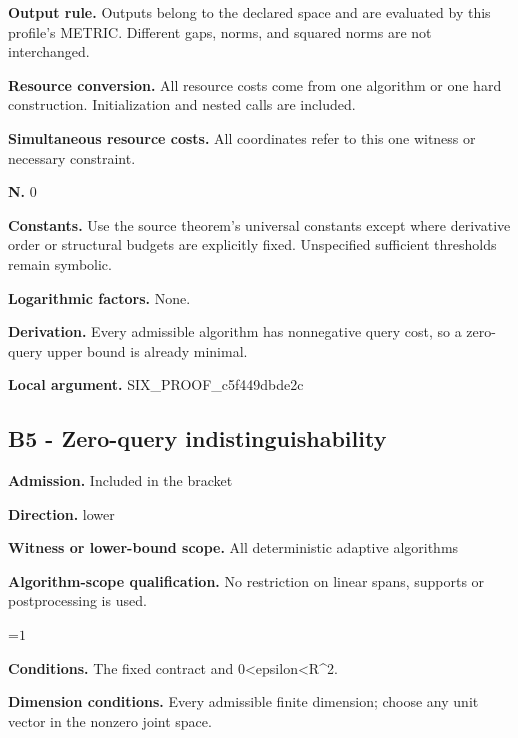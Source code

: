 \documentclass[10pt,a4paper]{article}
\newcommand{\AtlasMath}[1]{\par\begingroup\centering\setbox0=\hbox{$\displaystyle #1$}\ifdim\wd0>1.4\linewidth\typeout{ATLAS WIDE FORMULA: \the\wd0}\fi\ifdim\wd0>\linewidth\resizebox{\linewidth}{!}{\box0}\else\box0\fi\par\endgroup}
\begin{document}
\textbf{Output rule.} Outputs belong to the declared space and are evaluated by this profile's METRIC. Different gaps, norms, and squared norms are not interchanged.



\textbf{Resource conversion.} All resource costs come from one algorithm or one hard construction. Initialization and nested calls are included.



\textbf{Simultaneous resource costs.} All coordinates refer to this one witness or necessary constraint.



\textbf{N.} 0



\textbf{Constants.} Use the source theorem’s universal constants except where derivative order or structural budgets are explicitly fixed. Unspecified sufficient thresholds remain symbolic.



\textbf{Logarithmic factors.} None.



\textbf{Derivation.} Every admissible algorithm has nonnegative query cost, so a zero-query upper bound is already minimal.



\textbf{Local argument.} SIX\_PROOF\_c5f449dbde2c



\subsection{B5 - Zero-query indistinguishability}


\textbf{Admission.} Included in the bracket



\textbf{Direction.} lower



\textbf{Witness or lower-bound scope.} All deterministic adaptive algorithms



\textbf{Algorithm-scope qualification.} No restriction on linear spans, supports or postprocessing is used.



\AtlasMath{1}


\textbf{Conditions.} The fixed contract and 0<epsilon<R\textasciicircum{}2.



\textbf{Dimension conditions.} Every admissible finite dimension; choose any unit vector in the nonzero joint space.
\end{document}
